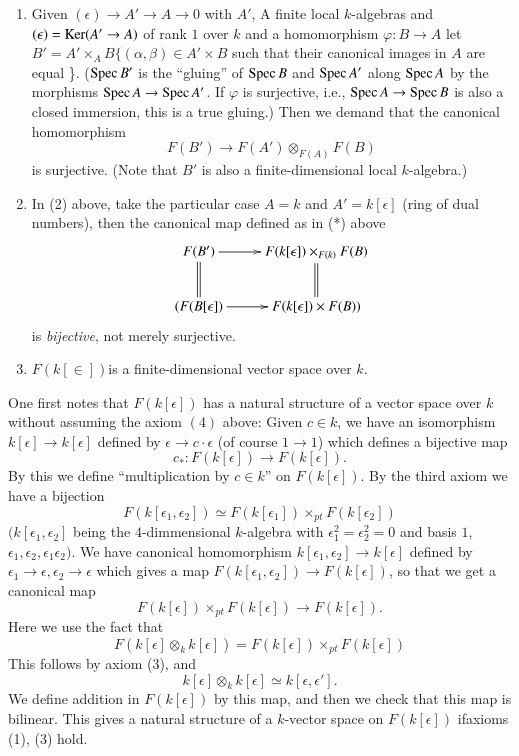 {\begin{theorem}
\begin{enumerate}[\rm(1)]
\item Given $(\epsilon)\to A'\to A\to 0$ with $A'$, A finite local
$k$-algebras and $(\epsilon)=\operatorname{Ker}(A'\to A)$ of rank $1$ over $k$ and a
homomorphism $\varphi:B \to A$ let $B'=A'\times_A
B\{(\alpha, \beta)\in A' \times B$ such that their canonical images
in $A$ are equal \}. ($\operatorname{Spec} B'$ is the ``gluing'' of $\operatorname{Spec} B$ and
$\operatorname{Spec} A'$ along $\operatorname{Spec} A$ by the morphisms $\operatorname{Spec} A \to \operatorname{Spec} A'$. If
$\varphi$ is surjective, i.e., $\operatorname{Spec} A \to \operatorname{Spec} B$ is also a closed
immersion, this is a true gluing.) Then we demand that the canonical
homomorphism 
\begin{equation*}
F(B')\to F(A')\otimes_{F(A)}F(B)
\end{equation*}
is surjective. (Note that $B'$ is also a finite-dimensional local $k$-algebra.)

\item In (2) above, take the particular case $A=k$ and
$A'=k[\epsilon]$ (ring of dual numbers), then the canonical map
defined as in (*) above 
\begin{equation*}
\xymatrix{
F(B')\ar @ {=} [d] \ar [r]& F(k[\epsilon])\times_{F(k)}\ar @ {=} [d] F(B)\\
(F(B[\epsilon])  \ar [r]& F(k[\epsilon])\times F(B))
}
\end{equation*}
is {\em bijective}, not merely surjective.

\item $F(k[\in])$\pageoriginale is a finite-dimensional vector space over $k$.
\end{enumerate}
\end{theorem}

\begin{remark}\label{part1-rem7.1}%
One first notes that $F(k[\epsilon])$ has a natural structure of a
vector space over $k$ without assuming the axiom $(4)$ above: Given
$c\in k$, we have an isomorphism $k[\epsilon]\to k[\epsilon]$ defined
by $\epsilon \to c \cdot\epsilon$ (of course $1\to 1$) which defines a
bijective map 
$$
c_{\ast}:F(k[\epsilon])\to F(k[\epsilon]).
$$
By this we define ``multiplication by $c\in k$'' on
$F(k[\epsilon])$. By the third axiom we have a bijection 
$$
F(k[\epsilon_1, \epsilon_2])\simeq F(k[\epsilon_1])\times_{pt} F(k[\epsilon_2])
$$ 
$(k[\epsilon_1, \epsilon_2]$ being the $4$-dimmensional $k$-algebra
with $\epsilon^2_1 = \epsilon^2_2 =0$ and basis $1$,
$\epsilon_1, \epsilon_2, \epsilon_1 \epsilon_2)$. We 
have canonical homomorphism $k[\epsilon_1, \epsilon_2]\to k[\epsilon]$
defined by $\epsilon_1\to \epsilon, \epsilon_2 \to \epsilon$ which
gives a map $F(k[\epsilon_1, \epsilon_2])\to F(k[\epsilon])$, so that
we get a canonical map 
$$
F(k[\epsilon])\times_{pt} F(k[\epsilon])\to F(k[\epsilon]).
$$
Here we use the fact that
$$
F(k[\epsilon] \otimes_k k[\epsilon])=F(k[\epsilon])\times_{pt}F(k[\epsilon])
$$
This follows by axiom (3), and
$$
k[\epsilon]\otimes_{k} k[\epsilon]\simeq k[\epsilon, \epsilon'].
$$
We define addition in $F(k[\epsilon])$ by this map, and then we check
that this map is bilinear. This gives a natural structure of a
$k$-vector space on $F(k[\epsilon])$ if\pageoriginale axioms (1), (3)
hold. 
\end{remark}

}
